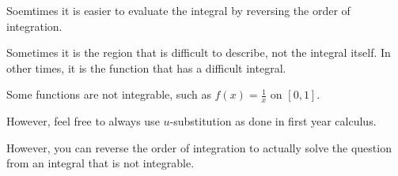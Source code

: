 \documentclass{article}
\begin{document}
\begin{tipbox}
    Soemtimes it is easier to evaluate the integral by reversing the order of integration.
\end{tipbox}

\begin{notebox}
    Sometimes it is the region that is difficult to describe, not the integral itself. In other times, it is the function that has a difficult integral.
\end{notebox}

Some functions are not integrable, such as \( f(x) = \frac{1}{x} \) on \( [0, 1] \).

However, feel free to always use \( u \)-substitution as done in first year calculus.

However, you can reverse the order of integration to actually solve the question from an integral that is not integrable.
\end{document}
